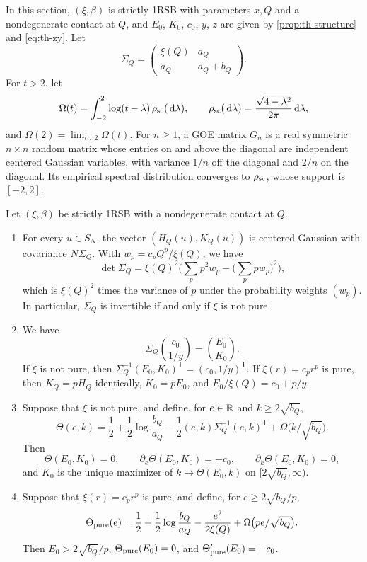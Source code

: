 In this section, $(\xi,\beta)$ is strictly 1RSB with parameters $x,Q$ and a nondegenerate contact at $Q$, and $E_0$, $K_0$, $c_0$, $y$, $z$ are given by \cref{prop:th-structure} and \eqref{eq:th-zy}. Let
\begin{equation}\label{eq:th-Sigma}
\Sigma_Q=\begin{pmatrix}\xi(Q)&a_Q\\a_Q&a_Q+b_Q\end{pmatrix}.
\end{equation}
For $t>2$, let
\[
\Omega(t)=\int_{-2}^2\log(t-\lambda)\,\rho_{\rm sc}(\,\mathrm d\lambda),\qquad\rho_{\rm sc}(\,\mathrm d\lambda)=\frac{\sqrt{4-\lambda^2}}{2\pi}\,\mathrm d\lambda,
\]
and $\Omega(2)=\lim_{t\downarrow2}\Omega(t)$. For $n\ge1$, a GOE matrix $G_n$ is a real symmetric $n\times n$ random matrix whose entries on and above the diagonal are independent centered Gaussian variables, with variance $1/n$ off the diagonal and $2/n$ on the diagonal. Its empirical spectral distribution converges to $\rho_{\rm sc}$, whose support is $[-2,2]$.

\begin{proposition}\label{prop:th-scores}
Let $(\xi,\beta)$ be strictly 1RSB with a nondegenerate contact at $Q$.
\begin{enumerate}
\item For every $u\in S_N$, the vector $(H_Q(u),K_Q(u))$ is centered Gaussian with covariance $N\Sigma_Q$. With $w_p=c_pQ^p/\xi(Q)$, we have
\[
\det\Sigma_Q=\xi(Q)^2\Big(\sum_pp^2w_p-\Big(\sum_ppw_p\Big)^2\Big),
\]
which is $\xi(Q)^2$ times the variance of $p$ under the probability weights $(w_p)$. In particular, $\Sigma_Q$ is invertible if and only if $\xi$ is not pure.
\item We have
\begin{equation}\label{eq:th-score}
\Sigma_Q\binom{c_0}{1/y}=\binom{E_0}{K_0}.
\end{equation}
If $\xi$ is not pure, then $\Sigma_Q^{-1}(E_0,K_0)^{\mathsf T}=(c_0,1/y)^{\mathsf T}$. If $\xi(r)=c_pr^p$ is pure, then $K_Q=pH_Q$ identically, $K_0=pE_0$, and $E_0/\xi(Q)=c_0+p/y$.
\item Suppose that $\xi$ is not pure, and define, for $e\in\mathbb R$ and $k\ge2\sqrt{b_Q}$,
\begin{equation}\label{eq:th-Theta}
\Theta(e,k)=\frac12+\frac12\log\frac{b_Q}{a_Q}-\frac12(e,k)\Sigma_Q^{-1}(e,k)^{\mathsf T}+\Omega\big(k/\sqrt{b_Q}\big).
\end{equation}
Then
\[
\Theta(E_0,K_0)=0,\qquad\partial_e\Theta(E_0,K_0)=-c_0,\qquad\partial_k\Theta(E_0,K_0)=0,
\]
and $K_0$ is the unique maximizer of $k\mapsto\Theta(E_0,k)$ on $[2\sqrt{b_Q},\infty)$.
\item Suppose that $\xi(r)=c_pr^p$ is pure, and define, for $e\ge2\sqrt{b_Q}/p$,
\[
\Theta_{\rm pure}(e)=\frac12+\frac12\log\frac{b_Q}{a_Q}-\frac{e^2}{2\xi(Q)}+\Omega\big(pe/\sqrt{b_Q}\big).
\]
Then $E_0>2\sqrt{b_Q}/p$, $\Theta_{\rm pure}(E_0)=0$, and $\Theta_{\rm pure}'(E_0)=-c_0$.
\end{enumerate}
\end{proposition}

